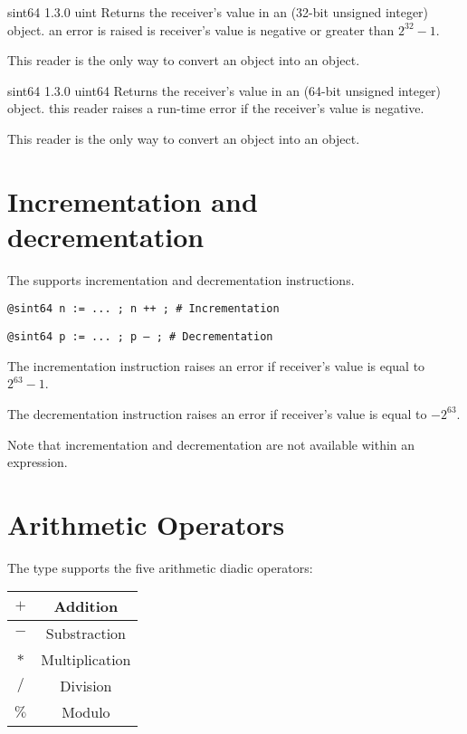 {sint64}
{1.3.0}
{uint}
{Returns the receiver's value in an  (32-bit unsigned integer) object.}
{an error is raised is receiver's value is negative or greater than $2^{32}-1$.}

This reader is the only way to convert an  object into an  object.





{sint64}
{1.3.0}
{uint64}
{Returns the receiver's value in an  (64-bit unsigned integer) object.}
{this reader raises a run-time error if the receiver's value is negative.}

This reader is the only way to convert an  object into an  object.







\section{Incrementation and decrementation}

The  supports incrementation and decrementation instructions.

\texttt{@sint64 n := ... ; n ++ ; \# Incrementation}

\texttt{@sint64 p := ... ; p -- ; \# Decrementation}\newline

The incrementation instruction raises an error if receiver's value is equal to $2^{63}-1$.\newline

The decrementation instruction raises an error if receiver's value is equal to $-2^{63}$.\newline

Note that incrementation and decrementation are not available within an expression.




\section{Arithmetic Operators}

The  type supports the five arithmetic diadic operators:\newline

\begin{tabular}{|c|c|}
\hline
$+$ & Addition \\
\hline
$-$ & Substraction \\
\hline
$*$ & Multiplication \\
\hline
$/$ & Division \\
\hline
$\%$ & Modulo \\
\hline
\end{tabular}

